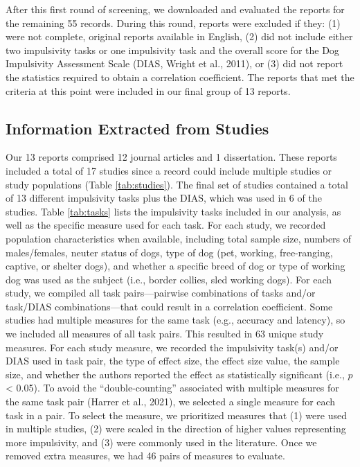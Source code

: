\documentclass[
  ,pub,floatsintext]{apa6}
\begin{document}
After this first round of screening, we downloaded and evaluated the reports for the remaining 55 records. During this round, reports were excluded if they: (1) were not complete, original reports available in English, (2) did not include either two impulsivity tasks or one impulsivity task and the overall score for the Dog Impulsivity Assessment Scale (DIAS, Wright et al., 2011), or (3) did not report the statistics required to obtain a correlation coefficient. The reports that met the criteria at this point were included in our final group of 13 reports.

\hypertarget{information-extracted-from-studies}{%
\subsection{Information Extracted from Studies}\label{information-extracted-from-studies}}

Our 13 reports comprised 12 journal articles and 1 dissertation. These reports included a total of 17 studies since a record could include multiple studies or study populations (Table \ref{tab:studies}). The final set of studies contained a total of 13 different impulsivity tasks plus the DIAS, which was used in 6 of the studies. Table \ref{tab:tasks} lists the impulsivity tasks included in our analysis, as well as the specific measure used for each task. For each study, we recorded population characteristics when available, including total sample size, numbers of males/females, neuter status of dogs, type of dog (pet, working, free-ranging, captive, or shelter dogs), and whether a specific breed of dog or type of working dog was used as the subject (i.e., border collies, sled working dogs). For each study, we compiled all task pairs---pairwise combinations of tasks and/or task/DIAS combinations---that could result in a correlation coefficient. Some studies had multiple measures for the same task (e.g., accuracy and latency), so we included all measures of all task pairs. This resulted in 63 unique study measures. For each study measure, we recorded the impulsivity task(s) and/or DIAS used in task pair, the type of effect size, the effect size value, the sample size, and whether the authors reported the effect as statistically significant (i.e., \(p\) \textless{} 0.05). To avoid the ``double-counting'' associated with multiple measures for the same task pair (Harrer et al., 2021), we selected a single measure for each task in a pair. To select the measure, we prioritized measures that (1) were used in multiple studies, (2) were scaled in the direction of higher values representing more impulsivity, and (3) were commonly used in the literature. Once we removed extra measures, we had 46 pairs of measures to evaluate.
\end{document}
